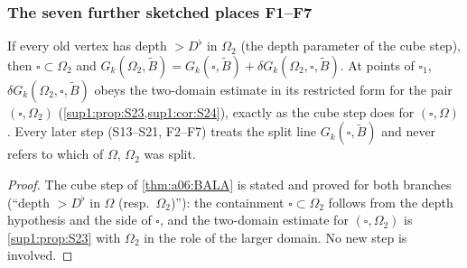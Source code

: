 
\subsubsection{The seven further sketched places F1--F7}\label{sup4:ssec:F}

\begin{lemma}\label{sup4:lem:F1}
If every old vertex has depth $>D^\flat$ in $\Omega_2$ (the depth parameter of the cube step), then $\square\subset\Omega_2$ and $G_k(\Omega_2,\tilde B)=G_k(\square,\tilde B)+\delta G_k(\Omega_2,\square,\tilde B)$. At points of $\square_1$, $\delta G_k(\Omega_2,\square,\tilde B)$ obeys the two-domain estimate \cite[(2.26)]{Ba1} in its restricted form for the pair $(\square,\Omega_2)$ (\cref{sup1:prop:S23,sup1:cor:S24}), exactly as the cube step does for $(\square,\Omega)$. Every later step (S13--S21, F2--F7) treats the split line $G_k(\square,\tilde B)$ and never refers to which of $\Omega$, $\Omega_2$ was split.
\end{lemma}

\begin{proof}
The cube step of \cref{thm:a06:BALA} is stated and proved for both branches (``depth $>D^\flat$ in $\Omega$ (resp.\ $\Omega_2$)''): the containment $\square\subset\Omega_2$ follows from the depth hypothesis and the side of $\square$, and the two-domain estimate for $(\square,\Omega_2)$ is \cref{sup1:prop:S23} with $\Omega_2$ in the role of the larger domain. No new step is involved.
\end{proof}

